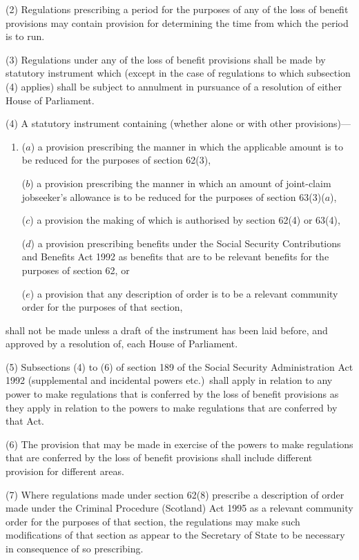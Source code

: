 \documentclass[12pt,a4paper]{article}
\begin{document}
(2) Regulations prescribing a period for the purposes of any of the loss of benefit provisions may contain provision for determining the time from which the period is to run.

(3) Regulations under any of the loss of benefit provisions shall be made by statutory instrument which (except in the case of regulations to which subsection (4)  applies) shall be subject to annulment in pursuance of a resolution of either House of Parliament.

(4) A statutory instrument containing (whether alone or with other provisions)—
\begin{enumerate}\item[]
($a$) a provision prescribing the manner in which the applicable amount is to be reduced for the purposes of section 62(3),

($b$) a provision prescribing the manner in which an amount of joint-claim jobseeker’s allowance is to be reduced for the purposes of section 63(3)($a$),

($c$) a provision the making of which is authorised by section 62(4)  or 63(4),

($d$) a provision prescribing benefits under the Social Security Contributions and Benefits Act 1992 as benefits that are to be relevant benefits for the purposes of section 62, or

($e$) a provision that any description of order is to be a relevant community order for the purposes of that section,
\end{enumerate}
shall not be made unless a draft of the instrument has been laid before, and approved by a resolution of, each House of Parliament.

(5) Subsections (4)  to (6)  of section 189 of the Social Security Administration Act 1992 (supplemental and incidental powers etc.)\ shall apply in relation to any power to make regulations that is conferred by the loss of benefit provisions as they apply in relation to the powers to make regulations that are conferred by that Act.

(6) The provision that may be made in exercise of the powers to make regulations that are conferred by the loss of benefit provisions shall include different provision for different areas.

(7) Where regulations made under section 62(8)  prescribe a description of order made under the Criminal Procedure (Scotland) Act 1995 as a relevant community order for the purposes of that section, the regulations may make such modifications of that section as appear to the Secretary of State to be necessary in consequence of so prescribing.
\end{document}
